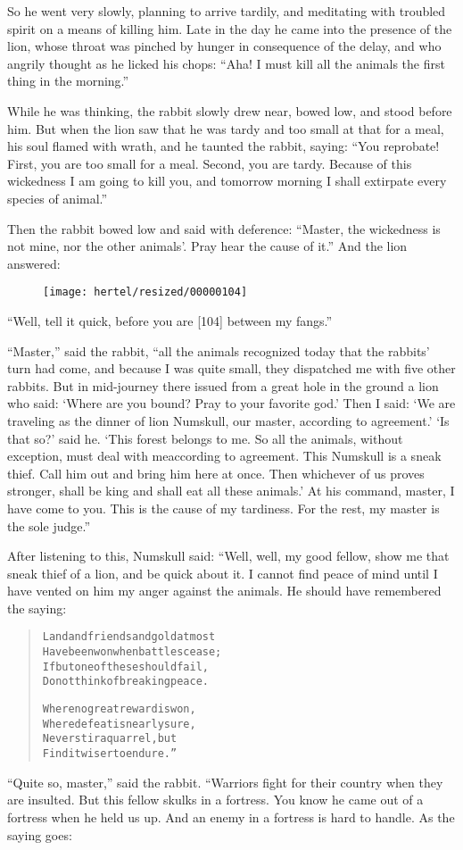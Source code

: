 \documentclass[article, twoside, 10pt]{memoir}
\renewenvironment{verbatim}{%
\begin{quote}%
\vskip -10pt%
\begin{alltt}\normalfont\small}{\end{alltt}%
\end{quote}%
\vskip -10pt
} %
\begin{document}
So he went very slowly, planning to arrive tardily, and meditating
with troubled spirit on a means of killing him. Late in the day he
came into the presence of the lion, whose throat was pinched by
hunger in consequence of the delay, and who angrily thought as he
licked his chops:
``Aha! I must kill all the animals the first thing in the morning.''

While he was thinking, the rabbit slowly drew near, bowed low, and
stood before him. But when the lion saw that he was tardy and too
small at that for a meal, his soul flamed with wrath, and he
taunted the rabbit, saying:
``You reprobate! First, you are too small for a meal. Second, you are tardy. Because of this wickedness I am going to kill you, and tomorrow morning I shall extirpate every species of animal.''

Then the rabbit bowed low and said with deference:
``Master, the wickedness is not mine, nor the other animals'. Pray hear the cause of it.''
And the lion answered:
\begin{figure}[p]\texttt{[image: hertel/resized/00000104]}\end{figure}``Well, tell it quick, before you are [104] between my fangs.''

``Master,'' said the rabbit,
``all the animals recognized today that the rabbits' turn had come, and because I was quite small, they dispatched me with five other rabbits. But in mid-journey there issued from a great hole in the ground a lion who said: `Where are you bound? Pray to your favorite god.' Then I said: `We are traveling as the dinner of lion Numskull, our master, according to agreement.' `Is that so?' said he. `This forest belongs to me. So all the animals, without exception, must deal with me{\textemdash}according to agreement. This Numskull is a sneak thief. Call him out and bring him here at once. Then whichever of us proves stronger, shall be king and shall eat all these animals.' At his command, master, I have come to you. This is the cause of my tardiness. For the rest, my master is the sole judge.''

After listening to this, Numskull said: “Well, well, my good
fellow, show me that sneak thief of a lion, and be quick about it.
I cannot find peace of mind until I have vented on him my anger
against the animals. He should have remembered the saying:

\begin{verbatim}
Land and friends and gold at most
    Have been won when battles cease;
If but one of these should fail,
    Do not think of breaking peace.

Where no great reward is won,
    Where defeat is nearly sure,
Never stir a quarrel, but
    Find it wiser to endure.”
\end{verbatim}
``Quite so, master,'' said the rabbit. “Warriors fight for their
country when they are insulted. But this fellow skulks in a
fortress. You know he came out of a fortress when he held us up.
And an enemy in a fortress is hard to handle. As the saying goes:
\end{document}
